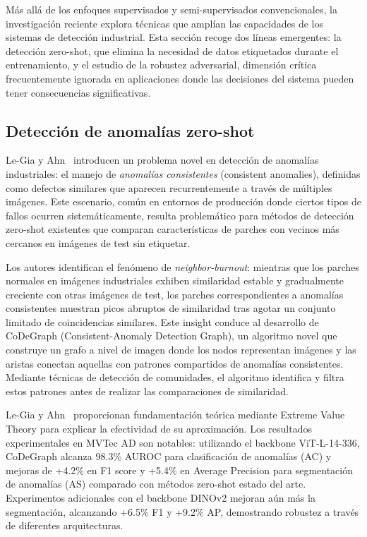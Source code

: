 Más allá de los enfoques supervisados y semi-supervisados convencionales, la investigación reciente explora técnicas que amplían las capacidades de los sistemas de detección industrial. Esta sección recoge dos líneas emergentes: la detección zero-shot, que elimina la necesidad de datos etiquetados durante el entrenamiento, y el estudio de la robustez adversarial, dimensión crítica frecuentemente ignorada en aplicaciones donde las decisiones del sistema pueden tener consecuencias significativas.

\subsection{Detección de anomalías zero-shot}

Le-Gia y Ahn~\cite{legia2025consistent} introducen un problema novel en detección de anomalías industriales: el manejo de \textit{anomalías consistentes} (consistent anomalies), definidas como defectos similares que aparecen recurrentemente a través de múltiples imágenes. Este escenario, común en entornos de producción donde ciertos tipos de fallos ocurren sistemáticamente, resulta problemático para métodos de detección zero-shot existentes que comparan características de parches con vecinos más cercanos en imágenes de test sin etiquetar.

Los autores identifican el fenómeno de \textit{neighbor-burnout}: mientras que los parches normales en imágenes industriales exhiben similaridad estable y gradualmente creciente con otras imágenes de test, los parches correspondientes a anomalías consistentes muestran picos abruptos de similaridad tras agotar un conjunto limitado de coincidencias similares. Este insight conduce al desarrollo de CoDeGraph (Consistent-Anomaly Detection Graph), un algoritmo novel que construye un grafo a nivel de imagen donde los nodos representan imágenes y las aristas conectan aquellas con patrones compartidos de anomalías consistentes. Mediante técnicas de detección de comunidades, el algoritmo identifica y filtra estos patrones antes de realizar las comparaciones de similaridad.

Le-Gia y Ahn~\cite{legia2025consistent} proporcionan fundamentación teórica mediante Extreme Value Theory para explicar la efectividad de su aproximación. Los resultados experimentales en MVTec AD son notables: utilizando el backbone ViT-L-14-336, CoDeGraph alcanza 98.3\% AUROC para clasificación de anomalías (AC) y mejoras de +4.2\% en F1 score y +5.4\% en Average Precision para segmentación de anomalías (AS) comparado con métodos zero-shot estado del arte. Experimentos adicionales con el backbone DINOv2 mejoran aún más la segmentación, alcanzando +6.5\% F1 y +9.2\% AP, demostrando robustez a través de diferentes arquitecturas.

